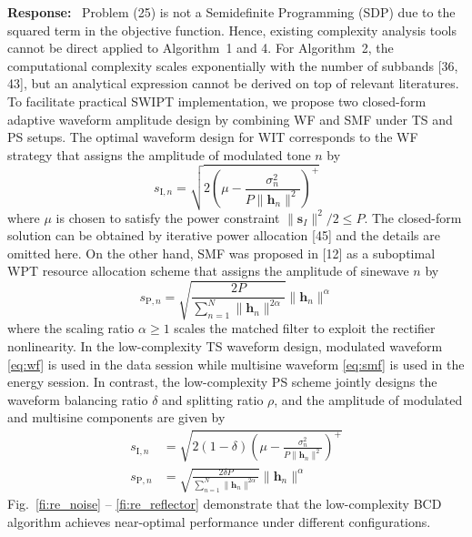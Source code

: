 \documentclass{article}
\newcounter{reviewer}
\newcounter{response}[reviewer]
\newenvironment{response}
	{\refstepcounter{response} \medskip \noindent \textbf{Response:}\ }
	{\medskip}
\begin{document}
\begin{reviewersection}
		\begin{response}
			Problem (25) is not a Semidefinite Programming (SDP) due to the squared term in the objective function. Hence, existing complexity analysis tools cannot be direct applied to Algorithm~1 and 4. For Algorithm~2, the computational complexity scales exponentially with the number of subbands [36, 43], but an analytical expression cannot be derived on top of relevant literatures. To facilitate practical SWIPT implementation, we propose two closed-form adaptive waveform amplitude design by combining WF and SMF under TS and PS setups. The optimal waveform design for WIT corresponds to the WF strategy that assigns the amplitude of modulated tone $n$ by
			\begin{equation}\label{eq:wf}
				s_{\mathrm{I}, n} = \sqrt{2\left(\mu - \frac{\sigma_n^2}{P \lVert{\boldsymbol{h}_n}\rVert^2}\right)^+}
			\end{equation}
			where $\mu$ is chosen to satisfy the power constraint $\lVert{\boldsymbol{s}_I}\rVert^2 / 2 \le P$. The closed-form solution can be obtained by iterative power allocation [45] and the details are omitted here. On the other hand, SMF was proposed in [12] as a suboptimal WPT resource allocation scheme that assigns the amplitude of sinewave $n$ by
			\begin{equation}\label{eq:smf}
				s_{\mathrm{P}, n} = \sqrt{\frac{2 P}{\sum_{n=1}^N \lVert{\boldsymbol{h}_n \rVert^{2 \alpha}}}}\lVert{\boldsymbol{h}_n}\rVert^\alpha
			\end{equation}
			where the scaling ratio $\alpha \ge 1$ scales the matched filter to exploit the rectifier nonlinearity. In the low-complexity TS waveform design, modulated waveform \eqref{eq:wf} is used in the data session while multisine waveform \eqref{eq:smf} is used in the energy session. In contrast, the low-complexity PS scheme jointly designs the waveform balancing ratio $\delta$ and splitting ratio $\rho$, and the amplitude of modulated and multisine components are given by
			\begin{align}
				s_{\mathrm{I}, n} &= \sqrt{2(1 - \delta)\left(\mu - \frac{\sigma_n^2}{P \lVert{\boldsymbol{h}_n}\rVert^2}\right)^+} \label{eq:s_i}\\
				s_{\mathrm{P}, n} &= \sqrt{\frac{2 \delta P}{\sum_{n=1}^N \lVert{\boldsymbol{h}_n \rVert^{2 \alpha}}}}\lVert{\boldsymbol{h}_n}\rVert^\alpha \label{eq:s_p}
			\end{align}
			Fig.~\ref{fi:re_noise} -- \ref{fi:re_reflector} demonstrate that the low-complexity BCD algorithm achieves near-optimal performance under different configurations.


\end{response}
\end{reviewersection}
\end{document}
